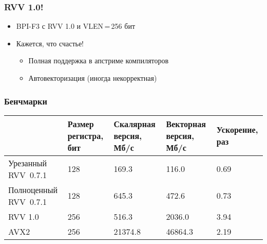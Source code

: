 \documentclass[
    aspectratio=169,
]{beamer}
\begin{document}
\begin{frame}
    \frametitle{RVV 1.0!}

    \begin{itemize}
        \item BPI-F3 с RVV 1.0 и VLEN\,=\,256 бит
        \item Кажется, что счастье!
              \begin{itemize}
                  \item Полная поддержка в апстриме компиляторов
                  \item Автовекторизация (иногда некорректная)
              \end{itemize}
    \end{itemize}

\end{frame}

\begin{frame}
    \frametitle{Бенчмарки}

    \begin{center}
        \begin{tabularx}{\textwidth}{YZZZZ}
            \toprule
                                  & Размер регистра, бит & Скалярная версия, Мб/с & Векторная версия, Мб/с & Ускорение, раз \\
            \midrule
            Урезанный RVV~0.7.1   & 128                  & 169.3                  & 116.0                  & 0.69           \\
            \midrule
            Полноценный RVV~0.7.1 & 128                  & 645.3                  & 472.6                  & 0.73           \\
            \midrule
            RVV 1.0               & 256                  & 516.3                  & 2036.0                 & 3.94           \\
            \midrule
            AVX2                  & 256                  & 21374.8                & 46864.3                & 2.19           \\
            \bottomrule
        \end{tabularx}
    \end{center}

\end{frame}
\end{document}
